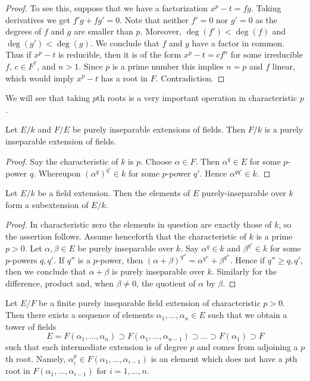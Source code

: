 \begin{proof}
To see this, suppose that we have a factorization
$x^p - t = f g$. Taking derivatives we get $f' g + f g' = 0$.
Note that neither $f' = 0$ nor $g' = 0$ as the degrees of $f$ and $g$
are smaller than $p$. Moreover, $\deg(f') < \deg(f)$ and $\deg(g') < \deg(g)$.
We conclude that $f$ and $g$ have a factor in common. Thus if $x^p - t$
is reducible, then it is of the form $x^p - t = c f^n$ for some irreducible
$f$, $c \in F^*$, and $n > 1$. Since $p$ is a prime number this
implies $n = p$ and $f$ linear, which would imply $x^p - t$ has a root
in $F$. Contradiction.
\end{proof}

\noindent
We will see that taking $p$th roots is a very important operation in
characteristic $p$.

\begin{lemma}
\label{lemma-purely-inseparable-permanence}
Let $E/k$ and $F/E$ be purely inseparable extensions of fields. Then $F/k$
is a purely inseparable extension of fields.
\end{lemma}

\begin{proof}
Say the characteristic of $k$ is $p$. Choose $\alpha \in F$. Then
$\alpha^q \in E$ for some $p$-power $q$. Whereupon $(\alpha^q)^{q'} \in k$
for some $p$-power $q'$. Hence $\alpha^{qq'} \in k$.
\end{proof}

\begin{lemma}
\label{lemma-purely-inseparable-elements}
Let $E/k$ be a field extension. Then the elements of $E$ purely-inseparable
over $k$ form a subextension of $E/k$.
\end{lemma}

\begin{proof}
In characteristic zero the elements in question are exactly those of $k$,
so the assertion follows. Assume henceforth that the characteristic of $k$
is a prime $p > 0$.
Let $\alpha, \beta \in E$ be purely inseparable over $k$. Say
$\alpha^q \in k$ and $\beta^{q'} \in k$ for some $p$-powers $q, q'$.
If $q''$ is a $p$-power, then
$(\alpha + \beta)^{q''} = \alpha^{q''} + \beta^{q''}$.
Hence if $q'' \geq q, q'$, then we conclude that $\alpha + \beta$
is purely inseparable over $k$. Similarly for the difference,
product and, when $\beta \not = 0$, the quotient of $\alpha$ by $\beta$.
\end{proof}

\begin{lemma}
\label{lemma-finite-purely-inseparable}
Let $E/F$ be a finite purely inseparable field extension of
characteristic $p > 0$. Then there exists a sequence of elements
$\alpha_1, \ldots, \alpha_n \in E$ such that we obtain a tower
of fields
$$
E = F(\alpha_1, \ldots, \alpha_n) \supset
F(\alpha_1, \ldots, \alpha_{n - 1}) \supset
\ldots
\supset F(\alpha_1) \supset F
$$
such that each intermediate extension is of degree $p$ and comes
from adjoining a $p$th root. Namely,
$\alpha_i^p \in F(\alpha_1, \ldots, \alpha_{i - 1})$
is an element which does not have a $p$th root in
$F(\alpha_1, \ldots, \alpha_{i - 1})$ for $i = 1, \ldots, n$.
\end{lemma}

